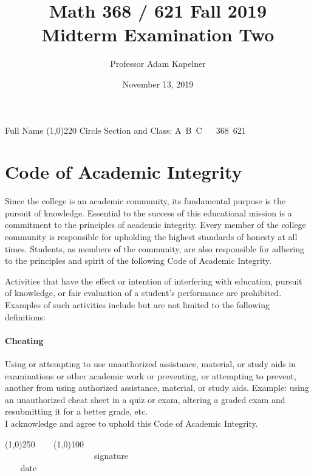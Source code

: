 \documentclass[12pt]{article}
\title{Math 368 / 621 Fall 2019 \\ Midterm Examination Two}
\author{Professor Adam Kapelner}
\date{November 13, 2019}
\begin{document}
\maketitle

\noindent Full Name \line(1,0){220} Circle Section and Class: A~B~C ~~ 368~621 

\thispagestyle{empty}

\section*{Code of Academic Integrity}

\footnotesize
Since the college is an academic community, its fundamental purpose is the pursuit of knowledge. Essential to the success of this educational mission is a commitment to the principles of academic integrity. Every member of the college community is responsible for upholding the highest standards of honesty at all times. Students, as members of the community, are also responsible for adhering to the principles and spirit of the following Code of Academic Integrity.

Activities that have the effect or intention of interfering with education, pursuit of knowledge, or fair evaluation of a student's performance are prohibited. Examples of such activities include but are not limited to the following definitions:

\paragraph{Cheating} Using or attempting to use unauthorized assistance, material, or study aids in examinations or other academic work or preventing, or attempting to prevent, another from using authorized assistance, material, or study aids. Example: using an unauthorized cheat sheet in a quiz or exam, altering a graded exam and resubmitting it for a better grade, etc.
\\

\noindent I acknowledge and agree to uphold this Code of Academic Integrity. \\

\begin{center}
\line(1,0){250} ~~~ \line(1,0){100}\\
~~~~~~~~~~~~~~~~~~~~~signature~~~~~~~~~~~~~~~~~~~~~~~~~~~~~~~~~~~~~~~~~~~~~ date
\end{center}

\normalsize

\vspace{-1cm}
\end{document}
